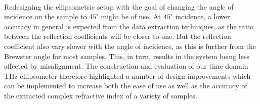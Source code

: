 \paragraph{}
Redesigning the ellipsometric setup with the goal of changing the angle of incidence on the sample to $45^{\circ}$ might be of use. At $45^{\circ}$ incidence, a lower accuracy in general is expected from the data extraction techniques, as the ratio between the reflection coefficients will be closer to one. But the reflection coefficient also vary slower with the angle of incidence, as this is further from the Brewster angle for most samples. This, in turn, results in the system being less affected by misalignment. The construction and evaluation of our time domain THz eliipsometer therefore highlighted a number of design improvements which can be implemented to increase both the ease of use as well as the accuracy of the extracted complex refractive index of a variety of samples.
\endinput